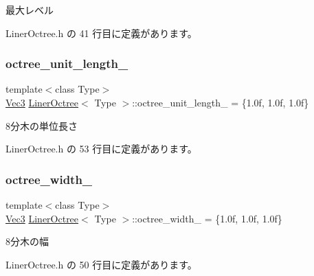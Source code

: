 最大レベル 



 Liner\+Octree.\+h の 41 行目に定義があります。

\mbox{\label{class_liner_octree_af412add67f71dd8ceb8af82be6015988}} 
\subsubsection{\texorpdfstring{octree\+\_\+unit\+\_\+length\+\_\+}{octree\_unit\_length\_}}
{\footnotesize\ttfamily template$<$class Type$>$ \\
\mbox{\hyperlink{_vector3_d_8h_ab16f59e4393f29a01ec8b9bbbabbe65d}{Vec3}} \mbox{\hyperlink{class_liner_octree}{Liner\+Octree}}$<$ Type $>$\+::octree\+\_\+unit\+\_\+length\+\_\+ = \{1.\+0f, 1.\+0f, 1.\+0f\}\hspace{0.3cm}{\ttfamily [private]}}



8分木の単位長さ 



 Liner\+Octree.\+h の 53 行目に定義があります。

\mbox{\label{class_liner_octree_accf45495e9a4cbf5ed3d8a839eda9806}} 
\subsubsection{\texorpdfstring{octree\+\_\+width\+\_\+}{octree\_width\_}}
{\footnotesize\ttfamily template$<$class Type$>$ \\
\mbox{\hyperlink{_vector3_d_8h_ab16f59e4393f29a01ec8b9bbbabbe65d}{Vec3}} \mbox{\hyperlink{class_liner_octree}{Liner\+Octree}}$<$ Type $>$\+::octree\+\_\+width\+\_\+ = \{1.\+0f, 1.\+0f, 1.\+0f\}\hspace{0.3cm}{\ttfamily [private]}}



8分木の幅 



 Liner\+Octree.\+h の 50 行目に定義があります。

